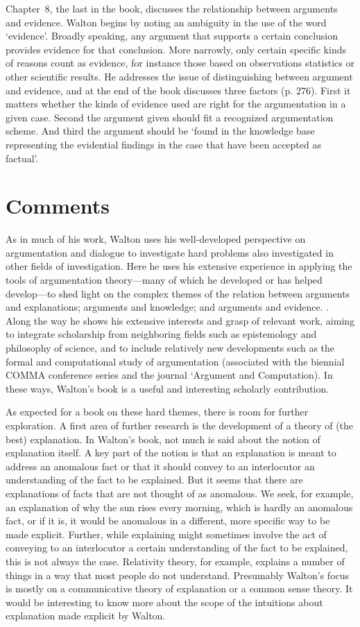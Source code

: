 \documentclass[12pt]{article}
\begin{document}
Chapter~8, the last in the book, discusses the relationship between
arguments and evidence. Walton begins by noting an ambiguity in the
use of the word `evidence'. Broadly speaking, any argument that
supports a certain conclusion provides evidence for that conclusion. More
narrowly, only certain specific kinds of reasons count as evidence, for instance those based on observations statistics or other scientific results. He addresses the issue of distinguishing between argument and evidence, and at the end of the book discusses three factors (p. 276). First it matters whether the kinds of evidence used are right for the argumentation in a given case. Second the argument given should fit a recognized argumentation scheme. And third the argument should be `found in the knowledge base representing the evidential findings in the case that have been accepted as factual'.

\section{Comments}
\label{comments}

\noindent As in much of his work, Walton uses his well-developed perspective on argumentation and dialogue to investigate hard problems also investigated in other fields of investigation. 
Here he uses his extensive experience in applying the tools of argumentation theory---many of which he developed or has helped develop---to shed light on the complex themes of the
relation between arguments and explanations; arguments and knowledge;
and arguments and evidence. . 
Along the way he shows his extensive interests and grasp of relevant work, aiming to integrate scholarship from neighboring fields such as epistemology and philosophy of science, and to include relatively new developments such as the formal and computational study of argumentation (associated with the biennial COMMA conference series and the journal `Argument and Computation). In these ways, Walton's book is a useful and interesting scholarly contribution.

As expected for a book on these hard themes, there is room for further exploration. A first area of further research is the development of a theory of (the
best) explanation. In Walton's book, not much is said about the notion of
explanation itself. A key part of the notion is that an
explanation is meant to address an anomalous fact or that it should
convey to an interlocutor an understanding of the fact to be
explained. But it seems that there are explanations of facts that are not thought of as anomalous. We seek, for example, an
explanation of why the sun rises every morning, which is hardly an
anomalous fact, or if it is, it would be
anomalous in a different, more specific way to be made explicit. Further, while explaining might sometimes
involve the act of conveying to an interlocutor a certain
understanding of the fact to be explained, this is not always the
case. Relativity theory, for example, explains a number of things in a
way that most people do not understand. Presumably Walton's focus is mostly on a
communicative theory of explanation or a common sense theory. It would be interesting to know more about the scope of the
intuitions about explanation made explicit by Walton.
\end{document}
